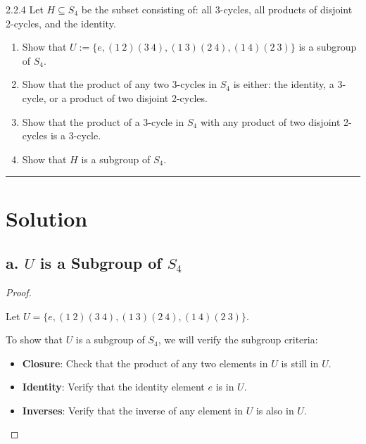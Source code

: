 \documentclass[12pt]{amsart}
\theoremstyle{definition}
\numberwithin{equation}{section}
\begin{document}
\begin{exercise}{2.2.4} 
    Let \(H \subseteq S_4\) be the subset consisting of: all 3-cycles, all products of disjoint 2-cycles, and the identity.
    \begin{enumerate}[label=\textbf{\alph*.}]
        \item Show that \(U := \{e, (1 \ 2)(3 \ 4), (1 \ 3)(2 \ 4), (1 \ 4)(2 \ 3)\}\) is a subgroup of \(S_4\).
    
        \item Show that the product of any two 3-cycles in \(S_4\) is either: the identity, a 3-cycle, or a product of two disjoint 2-cycles.
    
        \item Show that the product of a 3-cycle in \(S_4\) with any product of two disjoint 2-cycles is a 3-cycle.
    
        \item Show that \(H\) is a subgroup of \(S_4\).
    \end{enumerate}
    
    \noindent\rule{\linewidth}{1pt}
    
    \section*{Solution}
    
    \subsection*{\textbf{a. \(U\) is a Subgroup of \(S_4\)}}
    
    \begin{proof} \( \)
    
    Let \(U = \{e, (1 \ 2)(3 \ 4), (1 \ 3)(2 \ 4), (1 \ 4)(2 \ 3)\}\).
    
    To show that \(U\) is a subgroup of \(S_4\), we will verify the subgroup criteria:
    \begin{itemize}[label=--]
        \item \textbf{Closure}: Check that the product of any two elements in \(U\) is still in \(U\).
        \item \textbf{Identity}: Verify that the identity element \(e\) is in \(U\).
        \item \textbf{Inverses}: Verify that the inverse of any element in \(U\) is also in \(U\).
    \end{itemize}
    

\end{proof}
\end{exercise}
\end{document}
